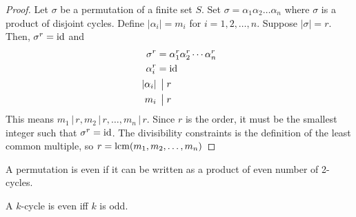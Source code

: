     \begin{proof}
        Let \(\sigma\) be a permutation of a finite set \(S\). Set \(\sigma = \alpha_1 \alpha_2 \ldots \alpha_n\) where \(\sigma\) is a product of disjoint cycles. Define \(|\alpha_i| = m_i\) for \(i = 1, 2, \ldots, n\). Suppose \(|\sigma| = r\). Then, \(\sigma^r = \operatorname{id}\) and
        \begin{align*}
            \sigma^r &= \alpha_1^r \alpha_2^r \cdots \alpha_n^r \\ 
            \alpha_i^r &= \operatorname{id} \\
            |\alpha_i| &\;\,\big|\; r \\
            m_i &\;\,\big|\; r
        \end{align*}
        This means \(m_1 \,|\,r, m_2 \,|\,r, \ldots, m_n \,|\,r\). Since \(r\) is the order, it must be the smallest integer such that \(\sigma^r = \operatorname{id}\). The divisibility constraints is the definition of the least common multiple, so \(r = \operatorname{lcm}(m_1, m_2, \ldots, m_n)\)
    \end{proof}

    \begin{dfn}
        A permutation is even if it can be written as a product of even number of 2-cycles.
    \end{dfn}

    \begin{thm}
        A \(k\)-cycle is even iff \(k\) is odd.
    \end{thm}